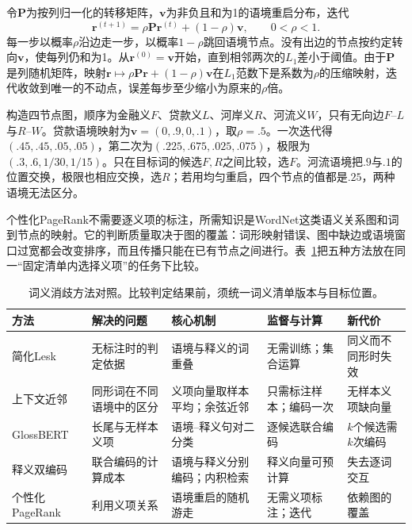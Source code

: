 令$\bm P$为按列归一化的转移矩阵，$\bm v$为非负且和为1的语境重启分布，迭代
\begin{equation}
 \bm r^{(t+1)}=\rho\bm P\bm r^{(t)}+(1-\rho)\bm v,
 \qquad 0<\rho<1.
 \label{eq:nlp-analysis-personalized-pagerank}
\end{equation}
每一步以概率$\rho$沿边走一步，以概率$1-\rho$跳回语境节点。没有出边的节点按约定转向$\bm v$，使每列仍和为1。从$\bm r^{(0)}=\bm v$开始，直到相邻两次的$L_1$差小于阈值。由于$\bm P$是列随机矩阵，映射$\bm r\mapsto\rho\bm P\bm r+(1-\rho)\bm v$在$L_1$范数下是系数为$\rho$的压缩映射，迭代收敛到唯一的不动点，误差每步至少缩小为原来的$\rho$倍。

构造四节点图，顺序为金融义$F$、贷款义$L$、河岸义$R$、河流义$W$，只有无向边$F$--$L$与$R$--$W$。贷款语境映射为$\bm v=(0,.9,0,.1)$，取$\rho=.5$。一次迭代得$(.45,.45,.05,.05)$，第二次为$(.225,.675,.025,.075)$，极限为$(.3,.6,1/30,1/15)$。只在目标词的候选$F,R$之间比较，选$F$。河流语境把$.9$与$.1$的位置交换，极限也相应交换，选$R$；若用均匀重启，四个节点的值都是$.25$，两种语境无法区分。

个性化PageRank不需要逐义项的标注，所需知识是WordNet这类语义关系图和词到节点的映射。它的判断质量取决于图的覆盖：词形映射错误、图中缺边或语境窗口过宽都会改变排序，而且传播只能在已有节点之间进行。表~\ref{tab:nlp-analysis-wsd-methods}把五种方法放在同一“固定清单内选择义项”的任务下比较。

\begin{table}[htbp]
  \centering
  \begin{tabularx}{\linewidth}{@{}l XXXX@{}}
    \toprule
    方法&解决的问题&核心机制&监督与计算&新代价\\
    \midrule
    简化Lesk&无标注时的判定依据&语境与释义的词重叠&无需训练；集合运算&同义而不同形时失效\\
    上下文近邻&同形词在不同语境中的区分&义项向量取样本平均；余弦近邻&只需标注样本；编码一次&无样本义项缺向量\\
    GlossBERT&长尾与无样本义项&语境--释义句对二分类&逐候选联合编码&$k$个候选需$k$次编码\\
    释义双编码&联合编码的计算成本&语境与释义分别编码；内积检索&释义向量可预计算&失去逐词交互\\
    个性化PageRank&利用义项关系&语境重启的随机游走&无需义项标注；迭代&依赖图的覆盖\\
    \bottomrule
  \end{tabularx}
  \caption{词义消歧方法对照。比较判定结果前，须统一词义清单版本与目标位置。}
  \label{tab:nlp-analysis-wsd-methods}
\end{table}

